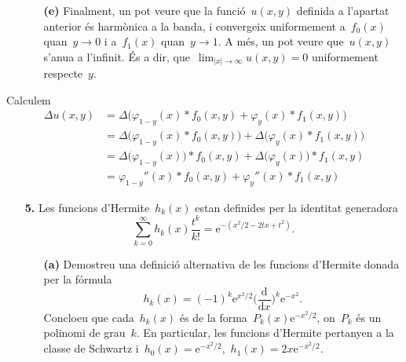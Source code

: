 \documentclass[a4paper]{article}
\theoremstyle{plain}
\theoremstyle{definition}
\newcommand{\e}{\mathrm{e}}
\newcommand{\diff}{\mathrm{d}}
\newcommand{\abs}[1]{\lvert{#1}\rvert}
\newcommand{\conv}{\mathop{\ast}}
\begin{document}
\begin{enumerate}
    \item[]\begin{enumerate}
        \item[\textbf{(e)}] Finalment, un pot veure que la funció~\(u(x,y)\)
            definida a l'apartat anterior és harmònica a la banda, i convergeix
            uniformement a~\(f_{0}(x)\) quan~\(y\to0\) i a~\(f_{1}(x)\)
            quan~\(y\to1\).
            A més, un pot veure que~\(u(x,y)\) s'anu{\lgem}a a l'infinit. És a
            dir, que~\(\lim_{\abs{x}\to\infty}u(x,y)=0\) uniformement
            respecte~\(y\).
    \end{enumerate}
\end{enumerate}

Calculem
\begin{align*}
    \Delta u(x,y) &= \Delta\bigl(
                        \varphi_{1-y}(x)\conv f_{0}(x,y)
                        + \varphi_{y}(x)\conv f_{1}(x,y)
                     \bigr) \\
                  &= \Delta\bigl(\varphi_{1-y}(x)\conv f_{0}(x,y)\bigr)
                     + \Delta\bigl(\varphi_{y}(x)\conv f_{1}(x,y)\bigr) \\
                  &= \Delta\bigl(\varphi_{1-y}(x)\bigr)\conv f_{0}(x,y)
                     + \Delta\bigl(\varphi_{y}(x)\bigr)\conv f_{1}(x,y) \\
                  &= \varphi_{1-y}''(x)\conv f_{0}(x,y)
                     + \varphi_{y}''(x)\conv f_{1}(x,y)
\end{align*}

\begin{enumerate}
    \item[\textbf{5.}] Les funcions d'Hermite~\(h_{k}(x)\) estan definides per
        la identitat generadora
        \[
            \sum_{k=0}^{\infty}
            h_{k}(x) \frac{t^{k}}{k!}
            =
            \e^{-(x^{2}/2 - 2tx+t^{2})}.
        \]
        \begin{enumerate}
            \item[\textbf{(a)}] Demostreu una definició alternativa de les
                funcions d'Hermite donada per la fórmula
                \[
                    h_{k}(x)
                    =
                    (-1)^{k} \e^{x^{2}/2}
                    \biggl(\frac{\diff}{\diff x}\biggr)^{k}
                    \e^{-x^{2}}.
                \]
                Concloeu que cada~\(h_{k}(x)\) és de la
                forma~\(P_{k}(x)\e^{-x^{2}/2}\), on~\(P_{k}\) és un polinomi de
                grau~\(k\).
                En particular, les funcions d'Hermite pertanyen a la classe de
                Schwartz i~\(h_{0}(x) =
                \e^{-x^{2}/2}\),~\(h_{1}(x)=2x\e^{-x^{2}/2}\).
        \end{enumerate}
\end{enumerate}
\end{document}
